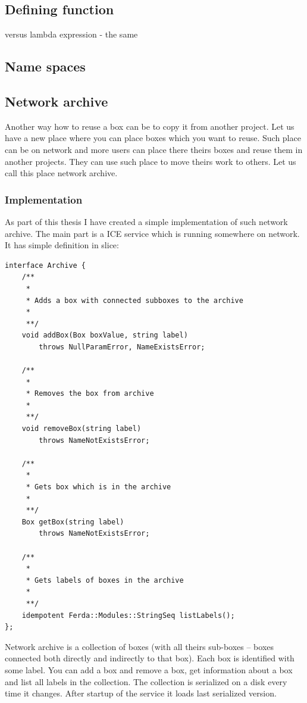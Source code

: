 \documentclass[a4paper,12pt]{book}
\begin{document}
\subsection{Defining function}
versus lambda expression - the same
\subsection{Name spaces}
\subsection{Network archive}
Another way how to reuse a box can be to copy it from another project. Let us have a new place where you can place boxes which you want to reuse. Such place can be on network and more users can place there theirs boxes and reuse them in another projects. They can use such place to move theirs work to others. Let us call this place network archive.

\subsubsection{Implementation}
As part of this thesis I have created a simple implementation of such network archive. The main part is a ICE service which is running somewhere on network. It has simple definition in slice:
\begin{verbatim}
interface Archive {
	/**
	 *
	 * Adds a box with connected subboxes to the archive
	 *
	 **/
	void addBox(Box boxValue, string label)
		throws NullParamError, NameExistsError;

	/**
	 *
	 * Removes the box from archive
	 *
	 **/
	void removeBox(string label)
		throws NameNotExistsError;

	/**
	 *
	 * Gets box which is in the archive
	 *
	 **/
	Box getBox(string label)
		throws NameNotExistsError;

	/**
	 *
	 * Gets labels of boxes in the archive
	 *
	 **/
	idempotent Ferda::Modules::StringSeq listLabels();
};
\end{verbatim}

Network archive is a collection of boxes (with all theirs sub-boxes -- boxes connected both directly and indirectly to that box). Each box is identified with some label. You can add a box and remove a box, get information about a box and list all labels in the collection. The collection is serialized on a disk every time it changes. After startup of the service it loads last serialized version.
\end{document}

